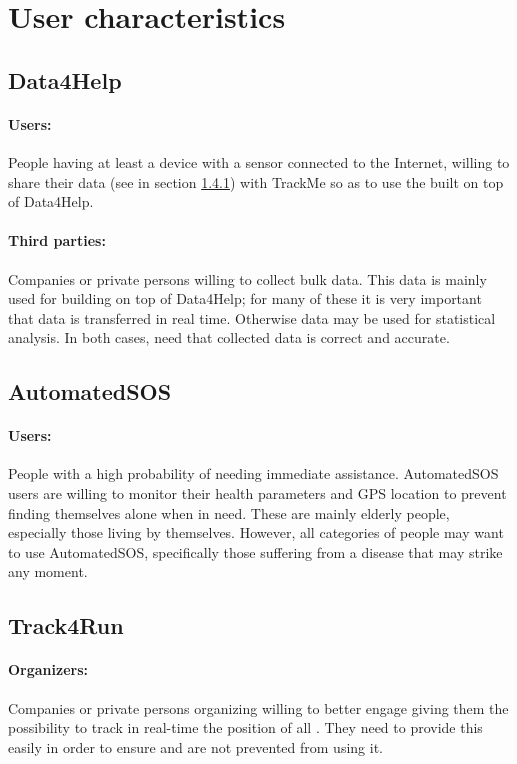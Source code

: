 \documentclass[../../rasd.tex]{subfiles}
\begin{document}
\section{User characteristics}
\subsection{Data4Help}
\paragraph{Users:}
	People having at least a device with a sensor connected to the Internet, willing to share their data (see  in section \hyperref[sect:1.4.1]{1.4.1}) with TrackMe so as to use the  built on top of Data4Help.
\paragraph{Third parties:}
	Companies or private persons willing to collect bulk data. This data is mainly used for building  on top of Data4Help; for many of these  it is very important that data is transferred in real time. Otherwise data may be used for statistical analysis. In both cases,  need that collected data is correct and accurate.

\subsection{AutomatedSOS}
\paragraph{Users:}
	People with a high probability of needing immediate assistance. AutomatedSOS users are willing to monitor their health parameters and GPS location to prevent finding themselves alone when in need. These are mainly elderly people, especially those living by themselves. However, all categories of people may want to use AutomatedSOS, specifically those suffering from a disease that may strike any moment.

\subsection{Track4Run}
\paragraph{Organizers:}
	Companies or private persons organizing  willing to better engage  giving them the possibility to track in real-time the position of all . They need to provide this  easily in order to ensure  and  are not prevented from using it.
\end{document}
